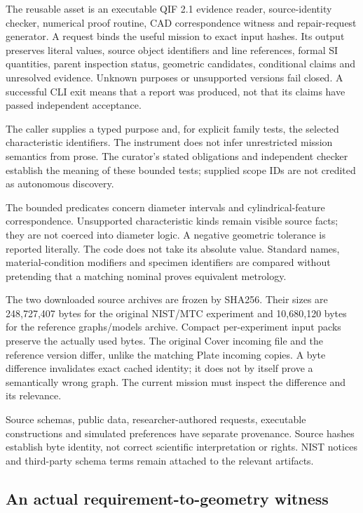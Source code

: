 \documentclass[
  11pt,
]{article}
\let\OriginalSubsection\subsection
\renewcommand{\subsection}{\needspace{6\baselineskip}\OriginalSubsection}
\begin{document}
The reusable asset is an executable QIF 2.1 evidence reader,
source-identity checker, numerical proof routine, CAD correspondence
witness and repair-request generator. A request binds the useful mission
to exact input hashes. Its output preserves literal values, source
object identifiers and line references, formal SI quantities, parent
inspection status, geometric candidates, conditional claims and
unresolved evidence. Unknown purposes or unsupported versions fail
closed. A successful CLI exit means that a report was produced, not that
its claims have passed independent acceptance.

The caller supplies a typed purpose and, for explicit family tests, the
selected characteristic identifiers. The instrument does not infer
unrestricted mission semantics from prose. The curator's stated
obligations and independent checker establish the meaning of these
bounded tests; supplied scope IDs are not credited as autonomous
discovery.

The bounded predicates concern diameter intervals and
cylindrical-feature correspondence. Unsupported characteristic kinds
remain visible source facts; they are not coerced into diameter logic. A
negative geometric tolerance is reported literally. The code does not
take its absolute value. Standard names, material-condition modifiers
and specimen identifiers are compared without pretending that a matching
nominal proves equivalent metrology.

The two downloaded source archives are frozen by SHA256. Their sizes are
248,727,407 bytes for the original NIST/MTC experiment and 10,680,120
bytes for the reference graphs/models archive. Compact per-experiment
input packs preserve the actually used bytes. The original Cover
incoming file and the reference version differ, unlike the matching
Plate incoming copies. A byte difference invalidates exact cached
identity; it does not by itself prove a semantically wrong graph. The
current mission must inspect the difference and its relevance.

Source schemas, public data, researcher-authored requests, executable
constructions and simulated preferences have separate provenance. Source
hashes establish byte identity, not correct scientific interpretation or
rights. NIST notices and third-party schema terms remain attached to the
relevant artifacts.

\hypertarget{an-actual-requirement-to-geometry-witness}{%
\subsection{An actual requirement-to-geometry
witness}\label{an-actual-requirement-to-geometry-witness}}
\end{document}
